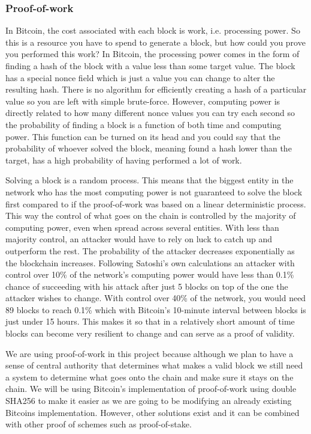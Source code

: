 \documentclass[12pt]{article}
\begin{document}
\subsubsection{Proof-of-work}\label{subsubsec:proofofwork}
In Bitcoin, the cost associated with each block is work, i.e. processing power. So this is a resource you have to spend to generate a block, but how could you prove you performed this work? In Bitcoin, the processing power comes in the form of finding a hash of the block with a value less than some target value. The block has a special nonce field which is just a value you can change to alter the resulting hash. There is no algorithm for efficiently creating a hash of a particular value so you are left with simple brute-force. However, computing power is directly related to how many different nonce values you can try each second so the probability of finding a block is a function of both time and computing power. This function can be turned on its head and you could say that the probability of whoever solved the block, meaning found a hash lower than the target, has a high probability of having performed a lot of work.


Solving a block is a random process. This means that the biggest entity in the network who has the most computing power is not guaranteed to solve the block first compared to if the proof-of-work was based on a linear deterministic process. This way the control of what goes on the chain is controlled by the majority of computing power, even when spread across several entities. With less than majority control, an attacker would have to rely on luck to catch up and outperform the rest. The probability of the attacker decreases exponentially as the blockchain increases. Following Satoshi's own calculations\cite{nakamoto2009bitcoin} an attacker with control over 10\% of the network's computing power would have less than 0.1\% chance of succeeding with his attack after just 5 blocks on top of the one the attacker wishes to change. With control over 40\% of the network, you would need 89 blocks to reach 0.1\% which with Bitcoin's 10-minute interval between blocks is just under 15 hours. This makes it so that in a relatively short amount of time blocks can become very resilient to change and can serve as a proof of validity.

We are using proof-of-work in this project because although we plan to have a sense of central authority that determines what makes a valid block we still need a system to determine what goes onto the chain and make sure it stays on the chain. We will be using Bitcoin's implementation of proof-of-work using double SHA256 to make it easier as we are going to be modifying an already existing Bitcoins implementation. However, other solutions exist and it can be combined with other proof of schemes such as proof-of-stake.
\end{document}
